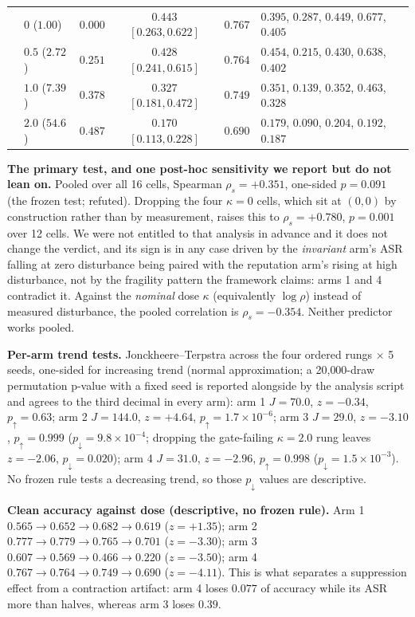 \documentclass{article}
\begin{document}
\begin{table}[h]
\begin{tabular}{llcccl}
 & $0$ ($1.00$) & $0.000$ & $0.443$ $[0.263, 0.622]$ & $0.767$ & $0.395$, $0.287$, $0.449$, $0.677$, $0.405$ \\
 & $0.5$ ($2.72$) & $0.251$ & $0.428$ $[0.241, 0.615]$ & $0.764$ & $0.454$, $0.215$, $0.430$, $0.638$, $0.402$ \\
 & $1.0$ ($7.39$) & $0.378$ & $0.327$ $[0.181, 0.472]$ & $0.749$ & $0.351$, $0.139$, $0.352$, $0.463$, $0.328$ \\
 & $2.0$ ($54.6$) & $0.487$ & $0.170$ $[0.113, 0.228]$ & $0.690$ & $0.179$, $0.090$, $0.204$, $0.192$, $0.187$ \\
\bottomrule
\end{tabular}
\end{table}

\textbf{The primary test, and one post-hoc sensitivity we report but do not lean on.} Pooled over all 16 cells, Spearman $\rho_s = +0.351$, one-sided $p = 0.091$ (the frozen test; refuted). Dropping the four $\kappa{=}0$ cells, which sit at $(0, 0)$ by construction rather than by measurement, raises this to $\rho_s = +0.780$, $p = 0.001$ over 12 cells. We were not entitled to that analysis in advance and it does not change the verdict, and its sign is in any case driven by the \emph{invariant} arm's ASR falling at zero disturbance being paired with the reputation arm's rising at high disturbance, not by the fragility pattern the framework claims: arms 1 and 4 contradict it. Against the \emph{nominal} dose $\kappa$ (equivalently $\log \rho$) instead of measured disturbance, the pooled correlation is $\rho_s = -0.354$. Neither predictor works pooled.

\textbf{Per-arm trend tests.} Jonckheere--Terpstra across the four ordered rungs $\times$ 5 seeds, one-sided for increasing trend (normal approximation; a 20{,}000-draw permutation p-value with a fixed seed is reported alongside by the analysis script and agrees to the third decimal in every arm): arm 1 $J = 70.0$, $z = -0.34$, $p_{\uparrow} = 0.63$; arm 2 $J = 144.0$, $z = +4.64$, $p_{\uparrow} = 1.7\times10^{-6}$; arm 3 $J = 29.0$, $z = -3.10$, $p_{\uparrow} = 0.999$ ($p_{\downarrow} = 9.8\times10^{-4}$; dropping the gate-failing $\kappa{=}2.0$ rung leaves $z = -2.06$, $p_{\downarrow} = 0.020$); arm 4 $J = 31.0$, $z = -2.96$, $p_{\uparrow} = 0.998$ ($p_{\downarrow} = 1.5\times10^{-3}$). No frozen rule tests a decreasing trend, so those $p_{\downarrow}$ values are descriptive.

\textbf{Clean accuracy against dose (descriptive, no frozen rule).} Arm 1 $0.565 \to 0.652 \to 0.682 \to 0.619$ ($z = +1.35$); arm 2 $0.777 \to 0.779 \to 0.765 \to 0.701$ ($z = -3.30$); arm 3 $0.607 \to 0.569 \to 0.466 \to 0.220$ ($z = -3.50$); arm 4 $0.767 \to 0.764 \to 0.749 \to 0.690$ ($z = -4.11$). This is what separates a suppression effect from a contraction artifact: arm 4 loses $0.077$ of accuracy while its ASR more than halves, whereas arm 3 loses $0.39$.
\end{document}
